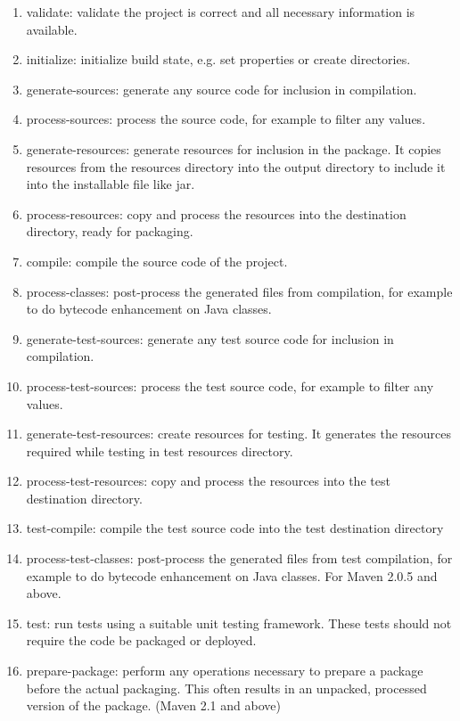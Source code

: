\documentclass[a4paper,oneside,1,english1pt]{report}
\begin{document}
				\begin{enumerate}
					\item validate:	validate the project is correct and all necessary information is available.
					\item initialize: 	initialize build state, e.g. set properties or create directories.
					\item generate-sources: 	generate any source code for inclusion in compilation.
					\item process-sources: 	process the source code, for example to filter any values.
					\item generate-resources: 	generate resources for inclusion in the package. It copies resources from the resources directory into the output directory to include it into the installable file like jar.
					\item process-resources: 	copy and process the resources into the destination directory, ready for packaging.
					\item compile: 	compile the source code of the project.
					\item process-classes: 	post-process the generated files from compilation, for example to do bytecode enhancement on Java classes.
					\item generate-test-sources: 	generate any test source code for inclusion in compilation.
					\item process-test-sources: 	process the test source code, for example to filter any values.
					\item generate-test-resources: 	create resources for testing. It generates the resources required while testing in test  resources directory.
					\item process-test-resources: 	copy and process the resources into the test destination directory.
					\item test-compile: 	compile the test source code into the test destination directory
					\item process-test-classes: 	post-process the generated files from test compilation, for example to do bytecode enhancement on Java classes. For Maven 2.0.5 and above.
					\item test: 	run tests using a suitable unit testing framework. These tests should not require the code be packaged or deployed.
					\item prepare-package: 	perform any operations necessary to prepare a package before the actual packaging. This often results in an unpacked, processed version of the package. (Maven 2.1 and above)

\end{enumerate}
\end{document}
